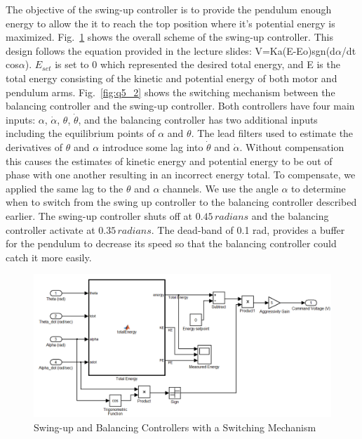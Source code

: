 \documentclass{article}
\theoremstyle{plain}
\theoremstyle{definition}
\theoremstyle{remark}
\begin{document}
The objective of the swing-up controller is to provide the pendulum enough energy to allow the it to reach the top position where it's potential energy is maximized.  Fig.~\ref{fig:q5_1} shows the overall scheme of the swing-up controller. This design follows the equation provided in the lecture slides: V=Ka(E-Eo)sgn(d$\alpha$/dt cos$\alpha$). $E_{set}$ is set to 0 which represented the desired total energy, and E is the total energy consisting of the kinetic and potential energy of both motor and pendulum arms.  Fig.~\ref{fig:q5_2} shows the switching mechanism between the balancing controller and the swing-up controller. Both controllers have four main inputs:  $\alpha$, $\dot{\alpha}$, $\theta$, $\dot{\theta}$, and the balancing controller has two additional inputs including the equilibrium points of $\alpha$ and $\theta$. The lead filters used to estimate the derivatives of $\theta$ and $\alpha$ introduce some lag into $\dot{\theta}$ and $\dot{\alpha}$.  Without compensation this causes the estimates of kinetic energy and potential energy to be out of phase with one another resulting in an incorrect energy total.  To compensate, we applied the same lag to the $\theta$ and $\alpha$ channels.  We use the angle $\alpha$ to determine when to switch from the swing up controller to the balancing controller described earlier. The swing-up controller shuts off at $0.45 \, radians$ and the balancing controller activate at $0.35 \, radians$.  The dead-band of 0.1 rad, provides a buffer for the pendulum to decrease its speed so that the balancing controller could catch it more easily.\\
\begin{figure}[b!]
\includegraphics[width=1\textwidth]{q5_1.png}
\caption{Swing-up and Balancing Controllers with a Switching Mechanism} \label{tex}
\label{fig:q5_1}
\end{figure}
\end{document}

